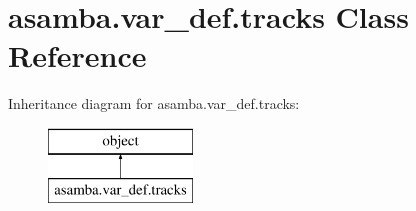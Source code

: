 \hypertarget{classasamba_1_1var__def_1_1tracks}{}\section{asamba.\+var\+\_\+def.\+tracks Class Reference}
\label{classasamba_1_1var__def_1_1tracks}
Inheritance diagram for asamba.\+var\+\_\+def.\+tracks\+:\begin{figure}[H]
\begin{center}
\leavevmode
\includegraphics[height=2.000000cm]{classasamba_1_1var__def_1_1tracks}
\end{center}
\end{figure}
